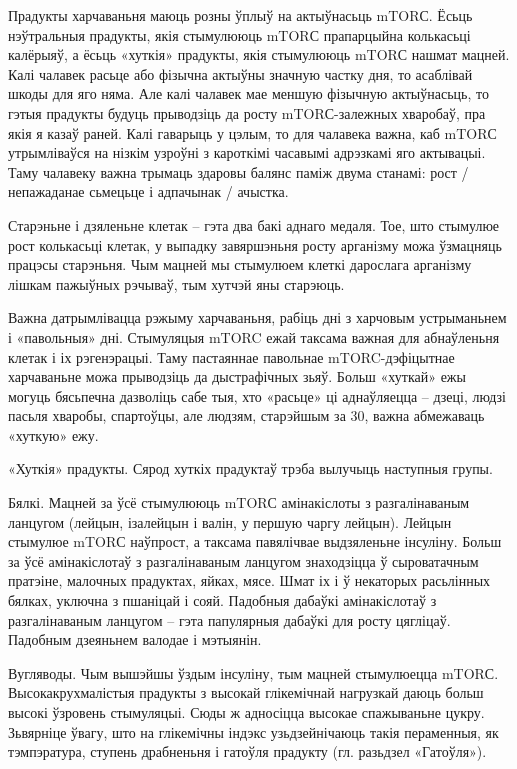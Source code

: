 Прадукты харчаваньня маюць розны ўплыў на актыўнасьць mTORС. Ёсьць нэўтральныя прадукты, якія стымулююць mTORС прапарцыйна колькасьці калёрыяў, а ёсьць «хуткія» прадукты, якія стымулююць mTORС нашмат мацней. Калі чалавек расьце або фізычна актыўны значную частку дня, то асаблівай шкоды для яго няма. Але калі чалавек мае меншую фізычную актыўнасьць, то гэтыя прадукты будуць прыводзіць да росту mTORС-залежных хваробаў, пра якія я казаў раней. Калі гаварыць у цэлым, то для чалавека важна, каб mTORС утрымліваўся на нізкім узроўні з кароткімі часавымі адрэзкамі яго актывацыі. Таму чалавеку важна трымаць здаровы балянс паміж двума станамі: рост / непажаданае сьмецьце і адпачынак / ачыстка.

Старэньне і дзяленьне клетак – гэта два бакі аднаго медаля. Тое, што стымулюе рост колькасьці клетак, у выпадку завяршэньня росту арганізму можа ўзмацняць працэсы старэньня. Чым мацней мы стымулюем клеткі дарослага арганізму лішкам пажыўных рэчываў, тым хутчэй яны старэюць.

Важна датрымлівацца рэжыму харчаваньня, рабіць дні з харчовым устрыманьнем і «павольныя» дні. Стымуляцыя mTORC ежай таксама важная для абнаўленьня клетак і іх рэгенэрацыі. Таму пастаяннае павольнае mTORC-дэфіцытнае харчаваньне можа прыводзіць да дыстрафічных зьяў. Больш «хуткай» ежы могуць бясьпечна дазволіць сабе тыя, хто «расьце» ці аднаўляецца – дзеці, людзі пасьля хваробы, спартоўцы, але людзям, старэйшым за 30, важна абмежаваць «хуткую» ежу.

«Хуткія» прадукты.
Сярод хуткіх прадуктаў трэба вылучыць наступныя групы.

Бялкі.
Мацней за ўсё стымулююць mTORС амінакіслоты з разгалінаваным ланцугом (лейцын, ізалейцын і валін, у першую чаргу лейцын). Лейцын стымулюе mTORС наўпрост, а таксама павялічвае выдзяленьне інсуліну. Больш за ўсё амінакіслотаў з разгалінаваным ланцугом знаходзіцца ў сыроватачным пратэіне, малочных прадуктах, яйках, мясе. Шмат іх і ў некаторых расьлінных бялках, уключна з пшаніцай і сояй. Падобныя дабаўкі амінакіслотаў з разгалінаваным ланцугом – гэта папулярныя дабаўкі для росту цягліцаў. Падобным дзеяньнем валодае і мэтыянін.

Вугляводы.
Чым вышэйшы ўздым інсуліну, тым мацней стымулюецца mTORС. Высокакрухмалістыя прадукты з высокай глікемічнай нагрузкай даюць больш высокі ўзровень стымуляцыі. Сюды ж адносіцца высокае спажываньне цукру. Зьвярніце ўвагу, што на глікемічны індэкс узьдзейнічаюць такія пераменныя, як тэмпэратура, ступень драбненьня і гатоўля прадукту (гл. разьдзел «Гатоўля»).

